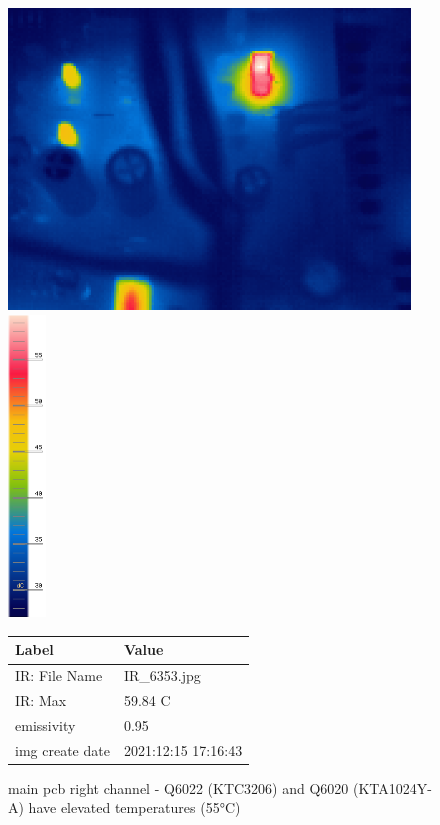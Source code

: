 \documentclass[a4paper,twoside]{report}
\begin{document}

\begin{figure}[hptb!]
 \centering
 \includegraphics[height=8cm, keepaspectratio=true]{img_report/IR_6353}
 \includegraphics[height=8cm, keepaspectratio=true]{img_report/IR_6353_scale}
 \label{fig:left-ch-ir}

 \vspace*{5mm}
 \begin{tabular}{ l | l }
  Label & Value \\ \hline
  IR: File Name & IR\_6353.jpg \\
  IR: Max & 59.84 C \\
  emissivity & 0.95 \\
  img create date & 2021:12:15 17:16:43 \\
 \end{tabular}
 \caption{main pcb right channel - Q6022 (KTC3206) and Q6020 (KTA1024Y-A) have elevated temperatures (55\si{\celsius})}
\end{figure}
\end{document}
